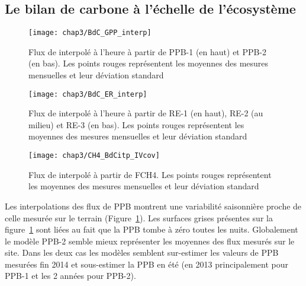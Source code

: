 \subsection{Le bilan de carbone à l'échelle de l'écosystème}


\begin{figure}[!hbt]
\centering
\texttt{[image: chap3/BdC\_GPP\_interp]}
\caption{Flux de \coo interpolé à l'heure à partir de PPB-1 (en haut) et PPB-2 (en bas). Les points rouges représentent les moyennes des mesures mensuelles et leur déviation standard}
\label{fig:BdC_GPP_interp}
\end{figure}

\begin{figure}
\centering
\texttt{[image: chap3/BdC\_ER\_interp]}
\caption{Flux de \coo interpolé à l'heure à partir de RE-1 (en haut), RE-2 (au milieu) et RE-3 (en bas). Les points rouges représentent les moyennes des mesures mensuelles et leur déviation standard}
\label{fig:BdC_ER_interp}
\end{figure}

\begin{figure}
\centering
\texttt{[image: chap3/CH4\_BdCitp\_IVcov]}
\caption{Flux de \coo interpolé à partir de FCH4. Les points rouges représentent les moyennes des mesures mensuelles et leur déviation standard}
\label{fig:BdC_CH4_interp}
\end{figure}



Les interpolations des flux de PPB montrent une variabilité saisonnière proche de celle mesurée sur le terrain (Figure~\ref{fig:BdC_GPP_interp}). 
Les surfaces grises présentes sur la figure~\ref{fig:BdC_GPP_interp} sont liées au fait que la PPB tombe à zéro toutes les nuits.
Globalement le modèle PPB-2 semble mieux représenter les moyennes des flux mesurés sur le site.
Dans les deux cas les modèles semblent sur-estimer les valeurs de PPB mesurées fin 2014 et sous-estimer la PPB en été (en 2013 principalement pour PPB-1 et les 2 années pour PPB-2).

